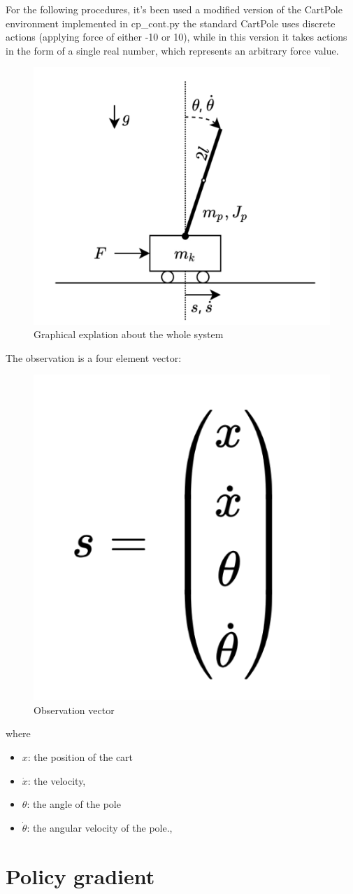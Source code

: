 \documentclass{article}
\begin{document}
For the following procedures, it's been used a modified version of the CartPole environment implemented in cp\_cont.py the standard CartPole uses discrete actions (applying force of either -10 or 10), while in this version it takes actions in the form of a single real number, which represents an arbitrary
force value.
\begin{figure}[h]
	\centering
	\includegraphics[width=0.5\linewidth]{../data/images/cart.png}
	\caption{Graphical explation about the whole system}
	\label{fig:plot1}
\end{figure}

\newpage

The observation is a four element vector: 
\begin{figure}[h]
	\centering
	\includegraphics[width=0.2\linewidth]{../data/images/vector.png}
	\caption{Observation vector}
	\label{fig:plot2}
\end{figure}

where 
\begin{itemize}
	\item $x$: the position of the cart
	\item $\dot{x}$: the velocity, 
	\item $\theta$:  the angle of the pole
	\item $\dot{\theta}$: the angular velocity of the pole., 	
\end{itemize}

\section{Policy gradient}
\end{document}
